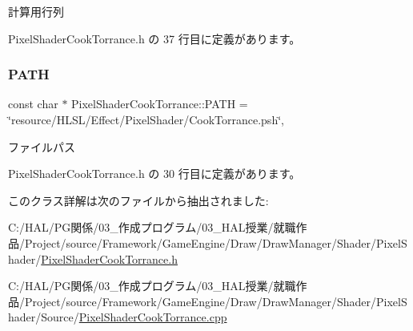 計算用行列 



 Pixel\+Shader\+Cook\+Torrance.\+h の 37 行目に定義があります。

\mbox{\label{class_pixel_shader_cook_torrance_a15a4b3e226f5c33dffe0d0679dd40134}} 
\subsubsection{\texorpdfstring{P\+A\+TH}{PATH}}
{\footnotesize\ttfamily const char $\ast$ Pixel\+Shader\+Cook\+Torrance\+::\+P\+A\+TH = \char`\"{}resource/H\+L\+SL/Effect/Pixel\+Shader/Cook\+Torrance.\+psh\char`\"{}\hspace{0.3cm}{\ttfamily [static]}, {\ttfamily [private]}}



ファイルパス 



 Pixel\+Shader\+Cook\+Torrance.\+h の 30 行目に定義があります。



このクラス詳解は次のファイルから抽出されました\+:\begin{DoxyCompactItemize}
\item 
C\+:/\+H\+A\+L/\+P\+G関係/03\+\_\+作成プログラム/03\+\_\+\+H\+A\+L授業/就職作品/\+Project/source/\+Framework/\+Game\+Engine/\+Draw/\+Draw\+Manager/\+Shader/\+Pixel\+Shader/\mbox{\hyperlink{_pixel_shader_cook_torrance_8h}{Pixel\+Shader\+Cook\+Torrance.\+h}}\item 
C\+:/\+H\+A\+L/\+P\+G関係/03\+\_\+作成プログラム/03\+\_\+\+H\+A\+L授業/就職作品/\+Project/source/\+Framework/\+Game\+Engine/\+Draw/\+Draw\+Manager/\+Shader/\+Pixel\+Shader/\+Source/\mbox{\hyperlink{_pixel_shader_cook_torrance_8cpp}{Pixel\+Shader\+Cook\+Torrance.\+cpp}}\end{DoxyCompactItemize}
